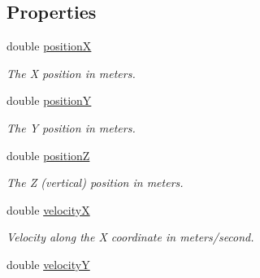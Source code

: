\subsection*{Properties}
\begin{CompactItemize}
\item 
\hypertarget{interface_i_m_s_r_point_object_e58103100c14480d8e227a16513e0361}{
double \hyperlink{interface_i_m_s_r_point_object_e58103100c14480d8e227a16513e0361}{positionX}}
\label{interface_i_m_s_r_point_object_e58103100c14480d8e227a16513e0361}

\begin{CompactList}\small\item\em The X position in meters. \item\end{CompactList}\item 
\hypertarget{interface_i_m_s_r_point_object_3e4d7f873692d035b261bbf03711e588}{
double \hyperlink{interface_i_m_s_r_point_object_3e4d7f873692d035b261bbf03711e588}{positionY}}
\label{interface_i_m_s_r_point_object_3e4d7f873692d035b261bbf03711e588}

\begin{CompactList}\small\item\em The Y position in meters. \item\end{CompactList}\item 
\hypertarget{interface_i_m_s_r_point_object_a377bc3ce2687176df00d9104076e6df}{
double \hyperlink{interface_i_m_s_r_point_object_a377bc3ce2687176df00d9104076e6df}{positionZ}}
\label{interface_i_m_s_r_point_object_a377bc3ce2687176df00d9104076e6df}

\begin{CompactList}\small\item\em The Z (vertical) position in meters. \item\end{CompactList}\item 
\hypertarget{interface_i_m_s_r_point_object_21c44c3fc1a46e8384da9babe782b6e0}{
double \hyperlink{interface_i_m_s_r_point_object_21c44c3fc1a46e8384da9babe782b6e0}{velocityX}}
\label{interface_i_m_s_r_point_object_21c44c3fc1a46e8384da9babe782b6e0}

\begin{CompactList}\small\item\em Velocity along the X coordinate in meters/second. \item\end{CompactList}\item 
\hypertarget{interface_i_m_s_r_point_object_209da76f675bd557c8da0c0986d26cc2}{
double \hyperlink{interface_i_m_s_r_point_object_209da76f675bd557c8da0c0986d26cc2}{velocityY}}
\label{interface_i_m_s_r_point_object_209da76f675bd557c8da0c0986d26cc2}


\end{CompactItemize}
